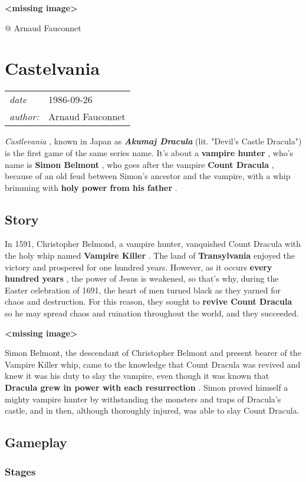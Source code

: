 \documentclass[a4paper,10pt]{book}
\newcommand{\pageHeader}[4]{
    \section{#1}
    \vspace{-0.3cm}
    \begin{table}[h!]
     \begin{tabular}{ll}
        \hline
        \textit{date} & #2 \\
        \textit{author: } & #3\\
        \hline
     \end{tabular}
    \end{table}
    \vspace{-0.3cm}
}
\begin{document}
 \textbf{<missing image>}
 
 
 @ Arnaud Fauconnet 
 
 \newpage\pageHeader{Castelvania}{1986-09-26}{Arnaud Fauconnet}{An action-adventure gothic horror video game series about vampire hunters.}
 
 \textit{Castlevania }, known in Japan as  \textit{\textbf{Akumaj Dracula } }
              (lit. "Devil's Castle Dracula") is the first game of the same series
              name. It's about a  \textbf{vampire hunter } , who's name is  \textbf{Simon Belmont } , who
              goes after the vampire  \textbf{Count Dracula } , because of an old feud between
              Simon's ancestor and the vampire, with a whip brimming with  \textbf{holy power
              from his father } . 
 \subsection{Story }
 In 1591, Christopher Belmond, a vampire hunter, vanquished Count
              Dracula with the holy whip named  \textbf{Vampire Killer } . The land of
               \textbf{Transylvania }  enjoyed the victory and prospered for one hundred years.
              However, as it occurs  \textbf{every hundred years } , the power of Jesus is
              weakened, so that's why, during the Easter celebration of 1691, the
              heart of men turned black as they yarned for chaos and destruction.
              For this reason, they sought to  \textbf{revive Count Dracula }  so he may spread
              chaos and ruination throughout the world, and they succeeded.
               
 
 
 \textbf{<missing image>}
 
 Simon Belmont, the descendant of Christopher Belmont and present
          bearer of the Vampire Killer whip, came to the knowledge that Count
          Dracula was revived and knew it was his duty to slay the vampire, even
          though it was known that  \textbf{Dracula grew in power with each
          resurrection } . Simon proved himself a mighty vampire hunter by
          withstanding the monsters and traps of Dracula's castle, and in then,
          although thoroughly injured, was able to slay Count Dracula. 
 \subsection{Gameplay }
 
 \subsubsection{Stages }
 
\end{document}
